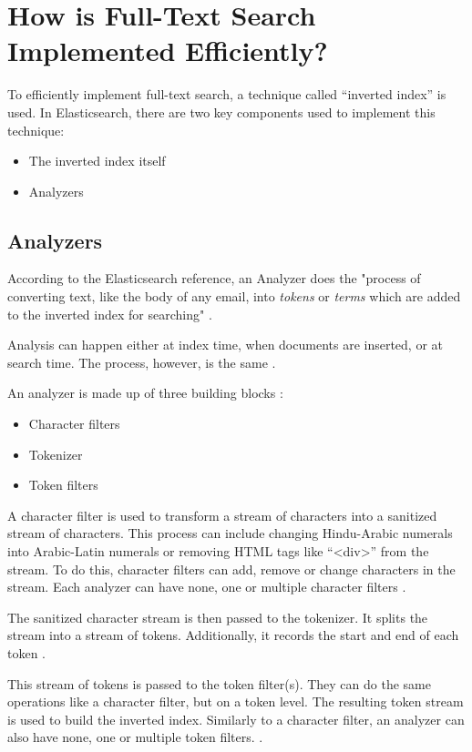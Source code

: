 \chapter{How is Full-Text Search Implemented Efficiently?}

To efficiently implement full-text search, a technique called “inverted index” is used. In Elasticsearch, there are two key components used to implement this technique:
\begin{itemize}
    \item The inverted index itself
    \item Analyzers
\end{itemize}

\section{Analyzers}
According to the Elasticsearch reference, an Analyzer does the "process of converting text, like the body of any email, into \textit{tokens} or \textit{terms} which are added to the inverted index for searching" \autocite{elasticsearch_anal} .

Analysis can happen either at index time, when documents are inserted, or at search time. The process, however, is the same \autocite{elasticsearch_anal}.

An analyzer is made up of three building blocks \autocite{elasticsearch_anal2}:
\begin{itemize}
    \item Character filters
    \item Tokenizer
    \item Token filters
\end{itemize}

A character filter is used to transform a stream of characters into a sanitized stream of characters. This process can include changing Hindu-Arabic numerals into Arabic-Latin numerals or removing HTML tags like “<div>” from the stream. To do this, character filters can add, remove or change characters in the stream. Each analyzer can have none, one or multiple character filters \autocite{elasticsearch_anal2}.

The sanitized character stream is then passed to the tokenizer. It splits the stream into a stream of tokens. Additionally, it records the start and end of each token \autocite{elasticsearch_anal2}.

This stream of tokens is passed to the token filter(s). They can do the same operations like a character filter, but on a token level. The resulting token stream is used to build the inverted index. Similarly to a character filter, an analyzer can also have none, one or multiple token filters. \autocite{elasticsearch_anal2}.


